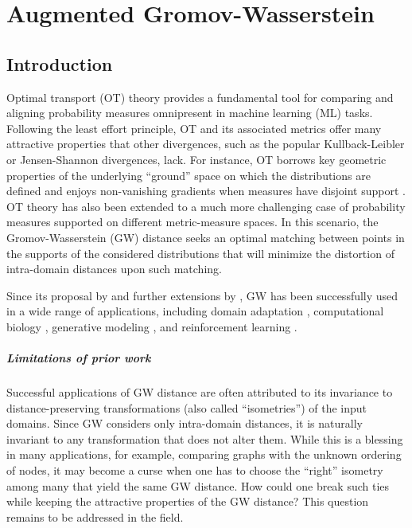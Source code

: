 
\chapter[Augmented Gromov-Wasserstein]{Augmented Gromov-Wasserstein}

\localtableofcontents*


\section{Introduction}

Optimal transport (OT) theory provides a fundamental tool for comparing and
aligning probability measures omnipresent in machine learning (ML) tasks.
Following the least effort principle, OT and its associated metrics offer
many attractive properties that other divergences, such as the popular Kullback-Leibler or
Jensen-Shannon divergences, lack. For instance, OT borrows key geometric properties of
the underlying ``ground'' space on which the distributions are defined \citep{Villani03}
and enjoys non-vanishing gradients when measures have disjoint support \citep{Arjovsky17}.
OT theory has also been extended to a much more challenging case of probability measures supported
on different metric-measure spaces. In this scenario, the Gromov-Wasserstein (GW) distance
seeks an optimal matching between points in the supports of the considered distributions
that will minimize the distortion of intra-domain distances upon such matching.

Since its proposal by \citep{Memoli11} and further extensions by \citep{Peyre16},
GW has been successfully used in a wide range of applications, including
domain adaptation \citep{Yan18}, computational biology
\citep{Nitzan2019,Pamona,UniPort,SpaOTsc,Demetci20,Demetci22,PASTE},
generative modeling \citep{Bunne19}, and reinforcement learning \citep{GW-VAE}.

\paragraph{Limitations of prior work} Successful applications of GW distance are often attributed to its invariance to distance-preserving transformations (also called ``isometries'') of the input domains. Since GW considers only intra-domain distances, it is naturally invariant to any transformation that does not alter them. While this is a blessing in many applications, for example, comparing graphs with the unknown ordering of nodes, it may become a curse when one has to choose the ``right'' isometry among many that yield the same GW distance. How could one break such ties while keeping the attractive properties of the GW distance? This question remains to be addressed in the field.

